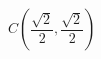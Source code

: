 \documentclass[preview]{standalone}
\begin{document}
\begin{center}
\(C\left(\dfrac{\sqrt{2}}{2}, \dfrac{\sqrt{2}}{2}\right)\)
\end{center}
\end{document}
